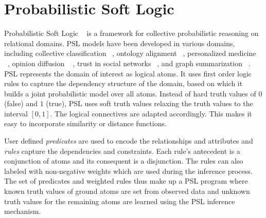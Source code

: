 \section{Probabilistic Soft Logic}
Probabilistic Soft Logic ~\cite{kimmig2012short} is a framework for collective probabilistic reasoning on relational domains.
PSL models have been developed in various domains, including collective classification ~\cite{broecheler2010computing}, ontology alignment ~\cite{brocheler2012probabilistic}, personalized medicine ~\cite{bach2010decision}, opinion diffusion ~\cite{bach2012scaling} , trust in social networks ~\cite{huang2012probabilistic}, and graph summarization ~\cite{memory2012graph}.
PSL represents the domain of interest as logical atoms.
It uses first order logic rules to capture the dependency structure of the domain, based on which it builds a joint probabilistic model over all atoms.
Instead of hard truth values of $0$ (false) and $1$ (true), PSL uses soft truth values relaxing the truth values to the interval $[0,1]$.
The logical connectives are adapted accordingly.
This makes it easy to incorporate similarity or distance functions.

User defined \emph{predicates} are used to encode the relationships and attributes and \emph{rules} capture the  dependencies and constraints.
Each rule's antecedent is a conjunction of atoms and its consequent is a disjunction. 
The rules can also labeled with non-negative weights which are used during the inference process. 
The set of predicates and weighted rules thus make up a PSL program where known truth values of ground atoms are set from observed data and unknown truth values for the remaining atoms are learned using the PSL inference mechanism.

